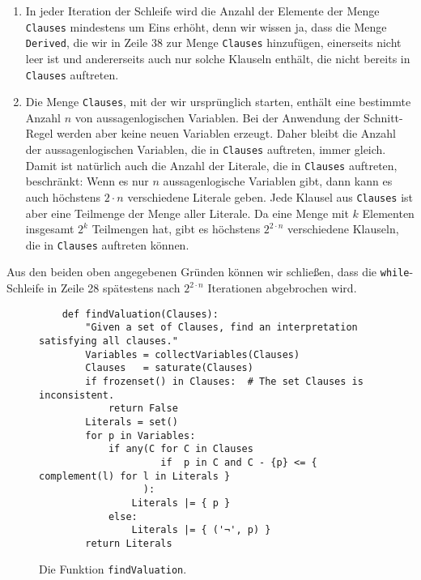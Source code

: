 \begin{enumerate}
\item In jeder Iteration der Schleife wird die Anzahl der Elemente der Menge \texttt{Clauses}
      mindestens um Eins erhöht, denn wir wissen ja, dass die Menge \texttt{Derived}, die wir in Zeile 38 zur
      Menge \texttt{Clauses} hinzufügen, einerseits nicht leer ist und andererseits auch nur solche
      Klauseln enthält, die nicht bereits in \texttt{Clauses} auftreten.
\item Die Menge \texttt{Clauses}, mit der wir ursprünglich starten, enthält eine bestimmte Anzahl $n$
      von aussagenlogischen Variablen.  Bei der Anwendung der Schnitt-Regel werden aber keine neuen
      Variablen erzeugt.  Daher bleibt die Anzahl der aussagenlogischen Variablen, die in
      \texttt{Clauses} auftreten, immer gleich.  Damit ist natürlich auch die Anzahl der Literale,
      die in \texttt{Clauses} auftreten, beschränkt: Wenn es nur $n$ aussagenlogische Variablen gibt,
      dann kann es auch höchstens $2 \cdot n$ verschiedene Literale geben.  Jede Klausel aus \texttt{Clauses} ist
      aber eine Teilmenge der Menge aller Literale.  Da eine Menge mit $k$ Elementen insgesamt $2^k$
      Teilmengen hat, gibt es höchstens $2^{2 \cdot n}$ verschiedene Klauseln, die in
      \texttt{Clauses} auftreten können.  
\end{enumerate}
Aus den beiden oben angegebenen Gründen können wir schließen, dass die \texttt{while}-Schleife in
Zeile 28 spätestens nach $2^{2 \cdot n}$ Iterationen abgebrochen wird.


\begin{figure}[!ht]
\centering
\begin{verbatim}
    def findValuation(Clauses):
        "Given a set of Clauses, find an interpretation satisfying all clauses."
        Variables = collectVariables(Clauses)
        Clauses   = saturate(Clauses)
        if frozenset() in Clauses:  # The set Clauses is inconsistent.
            return False
        Literals = set()
        for p in Variables:
            if any(C for C in Clauses 
                     if  p in C and C - {p} <= { complement(l) for l in Literals }
                  ):
                Literals |= { p }
            else:
                Literals |= { ('¬', p) }
        return Literals
\end{verbatim}
\vspace*{-0.3cm}
\caption{Die Funktion \texttt{findValuation}.}
\label{fig:Completeness.ipynb-3}
\end{figure}

